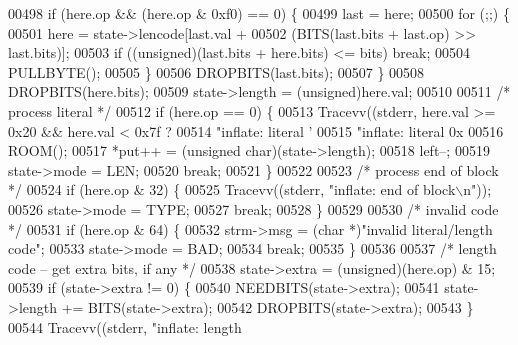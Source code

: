 \begin{DoxyCode}
{{{{00498             \textcolor{keywordflow}{if} (here.op && (here.op & 0xf0) == 0) \{
00499                 last = here;
00500                 \textcolor{keywordflow}{for} (;;) \{
00501                     here = state->lencode[last.val +
00502                             (BITS(last.bits + last.op) >> last.bits)];
00503                     \textcolor{keywordflow}{if} ((\textcolor{keywordtype}{unsigned})(last.bits + here.bits) <= bits) \textcolor{keywordflow}{break};
00504                     PULLBYTE();
00505                 \}
00506                 DROPBITS(last.bits);
00507             \}
00508             DROPBITS(here.bits);
00509             state->length = (unsigned)here.val;
00510 
00511             \textcolor{comment}{/* process literal */}
00512             if (here.op == 0) \{
00513                 Tracevv((stderr, here.val >= 0x20 && here.val < 0x7f ?
00514                         \textcolor{stringliteral}{"inflate:         literal '%
00515                         \textcolor{stringliteral}{"inflate:         literal 0x%
00516                 ROOM();
00517                 *put++ = (\textcolor{keywordtype}{unsigned} char)(state->length);
00518                 left--;
00519                 state->mode = LEN;
00520                 \textcolor{keywordflow}{break};
00521             \}
00522 
00523             \textcolor{comment}{/* process end of block */}
00524             \textcolor{keywordflow}{if} (here.op & 32) \{
00525                 Tracevv((stderr, \textcolor{stringliteral}{"inflate:         end of block\(\backslash\)n"}));
00526                 state->mode = TYPE;
00527                 \textcolor{keywordflow}{break};
00528             \}
00529 
00530             \textcolor{comment}{/* invalid code */}
00531             \textcolor{keywordflow}{if} (here.op & 64) \{
00532                 strm->msg = (\textcolor{keywordtype}{char} *)\textcolor{stringliteral}{"invalid literal/length code"};
00533                 state->mode = BAD;
00534                 \textcolor{keywordflow}{break};
00535             \}
00536 
00537             \textcolor{comment}{/* length code -- get extra bits, if any */}
00538             state->extra = (unsigned)(here.op) & 15;
00539             \textcolor{keywordflow}{if} (state->extra != 0) \{
00540                 NEEDBITS(state->extra);
00541                 state->length += BITS(state->extra);
00542                 DROPBITS(state->extra);
00543             \}
00544             Tracevv((stderr, \textcolor{stringliteral}{"inflate:         length %
}}}}}}}
\end{DoxyCode}
